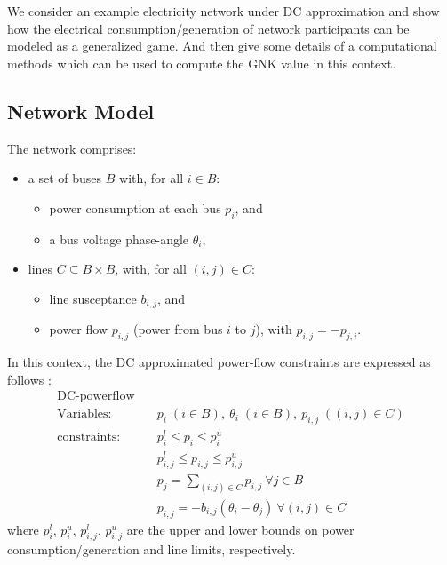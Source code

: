 We consider an example electricity network under DC approximation and show how the electrical consumption/generation of network participants can be modeled as a generalized game. And then give some details of a computational methods which can be used to compute the GNK value in this context.

\subsection{Network Model}\label{sec:the_setup}


The network comprises:
\begin{itemize}
    \item a set of buses $B$ with, for all $i\in B$:
    \begin{itemize} 
        \item power consumption at each bus $p_i$, and 
        \item a bus voltage phase-angle $\theta_i$,
    \end{itemize}
    \item lines 
    $C\subseteq B\times B$, with, for all $(i,j)\in C$: 
        \begin{itemize} 
        \item line susceptance $b_{i,j}$, and 
        \item power flow $p_{i,j}$ (power from bus $i$ to $j$), with $p_{i,j}=-p_{j,i}$. 
    \end{itemize}
\end{itemize}
In this context, the DC approximated power-flow constraints are expressed as follows \cite{Wang1}:
\begin{equation}
\label{dcopf1}
\begin{aligned}
\text{DC-powerflow} \quad& \\
\text{Variables:} \quad&  p_i\; (i\in B),\ \theta_i\; (i\in B),\ p_{i,j}\; ((i,j)\in C) \\
\text{constraints:} \quad& p_i^{l}\le p_i \le p_i^{u} \\
&p_{i,j}^l \le p_{i,j} \le p_{i,j}^u \\
&p_j = \sum_{(i,j)\in C}p_{i,j}~\forall j\in B\\
&p_{i,j} = -b_{i,j}(\theta_i - \theta_j) ~\forall(i,j)\in C
\end{aligned}
\end{equation}
where $p_i^{l}$, $p_i^{u}$, $p_{i,j}^l$, $p_{i,j}^u$ are the upper and lower bounds on power consumption/generation and line limits, respectively.

